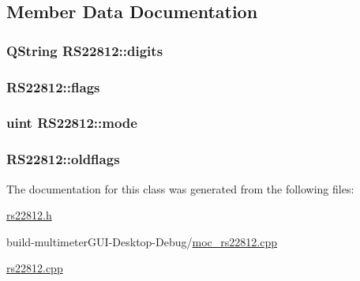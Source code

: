 \subsection{Member Data Documentation}
\hypertarget{class_r_s22812_a4514e9e982441cab9143a9c36a64429c}{
\subsubsection[{digits}]{\setlength{\rightskip}{0pt plus 5cm}Q\-String R\-S22812\-::digits\hspace{0.3cm}{\ttfamily [private]}}}\label{class_r_s22812_a4514e9e982441cab9143a9c36a64429c}
\hypertarget{class_r_s22812_a6c8e4c27f876fdfd10bf153b36bd6254}{
\subsubsection[{flags}]{ R\-S22812\-::flags\hspace{0.3cm}{\ttfamily [private]}}}\label{class_r_s22812_a6c8e4c27f876fdfd10bf153b36bd6254}
\hypertarget{class_r_s22812_a368cc94b2c66bdc6d456e413de9217be}{
\subsubsection[{mode}]{\setlength{\rightskip}{0pt plus 5cm}uint R\-S22812\-::mode\hspace{0.3cm}{\ttfamily [private]}}}\label{class_r_s22812_a368cc94b2c66bdc6d456e413de9217be}
\hypertarget{class_r_s22812_a167304591d2e351f70975b608718946b}{
\subsubsection[{oldflags}]{ R\-S22812\-::oldflags\hspace{0.3cm}{\ttfamily [private]}}}\label{class_r_s22812_a167304591d2e351f70975b608718946b}


The documentation for this class was generated from the following files\-:\begin{DoxyCompactItemize}
\item 
\hyperlink{rs22812_8h}{rs22812.\-h}\item 
build-\/multimeter\-G\-U\-I-\/\-Desktop-\/\-Debug/\hyperlink{moc__rs22812_8cpp}{moc\-\_\-rs22812.\-cpp}\item 
\hyperlink{rs22812_8cpp}{rs22812.\-cpp}\end{DoxyCompactItemize}
